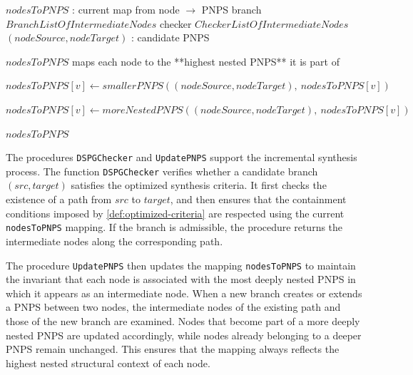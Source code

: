 \begin{algorithm}
\caption{UpdatePNPS}
\label{alg:update-pnps}
\begin{algorithmic}[1]
\Require $nodesToPNPS$ : current map from node $\rightarrow$ PNPS
\Require branch $BranchListOfIntermediateNodes$
\Require checker $CheckerListOfIntermediateNodes$
\Require $(nodeSource, nodeTarget)$ : candidate PNPS

\Ensure $nodesToPNPS$ maps each node to the **highest nested PNPS** it is part of

\State $nodesToPNPS[v] \gets smallerPNPS((nodeSource, nodeTarget),\ nodesToPNPS[v])$
\EndFor

\State $nodesToPNPS[v] \gets moreNestedPNPS((nodeSource, nodeTarget),\ nodesToPNPS[v])$
\EndFor

\State \Return $nodesToPNPS$

\end{algorithmic}
\end{algorithm}

The procedures \texttt{DSPGChecker} and \texttt{UpdatePNPS} support the incremental synthesis process. The function \texttt{DSPGChecker} verifies whether a candidate branch $(src,target)$ satisfies the optimized synthesis criteria. It first checks the existence of a path from $src$ to $target$, and then ensures that the containment conditions imposed by \cref{def:optimized-criteria} are respected using the current \texttt{nodesToPNPS} mapping. If the branch is admissible, the procedure returns the intermediate nodes along the corresponding path. 

The procedure \texttt{UpdatePNPS} then updates the mapping \texttt{nodesToPNPS} to maintain the invariant that each node is associated with the most deeply nested \ac{PNPS} in which it appears as an intermediate node. When a new branch creates or extends a \ac{PNPS} between two nodes, the intermediate nodes of the existing path and those of the new branch are examined. Nodes that become part of a more deeply nested \ac{PNPS} are updated accordingly, while nodes already belonging to a deeper \ac{PNPS} remain unchanged.  This ensures that the mapping always reflects the highest nested structural context of each node.

